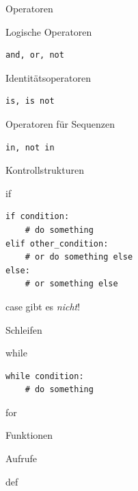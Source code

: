 \begin{frame}[fragile]{Operatoren}
  \begin{spacing}{1.0}
    \begin{block}{Logische Operatoren}
      \begin{verbatim}
and, or, not
      \end{verbatim}
    \end{block}
    \begin{block}{Identitätsoperatoren}
      \begin{verbatim}
is, is not
      \end{verbatim}
    \end{block}
    \begin{block}{Operatoren für Sequenzen}
      \begin{verbatim}
in, not in
      \end{verbatim}
    \end{block}
  \end{spacing}
\end{frame}

\begin{frame}[fragile]{Kontrollstrukturen}
  \begin{spacing}{1.0}
    \begin{block}{if}
      \begin{verbatim}
if condition:
    # do something
elif other_condition:
    # or do something else
else:
    # or something else
      \end{verbatim}
    \end{block}
    \begin{block}{case}
      gibt es \emph{nicht}!
    \end{block}
  \end{spacing}
\end{frame}

\begin{frame}[fragile]{Schleifen}
  \begin{block}{while}
    \begin{verbatim}
while condition:
    # do something
    \end{verbatim}
  \end{block}
  \begin{block}{for}
  \end{block}
\end{frame}

\begin{frame}{Funktionen}
  \begin{block}{Aufrufe}
  \end{block}
  \begin{block}{def}
  \end{block}
\end{frame}

